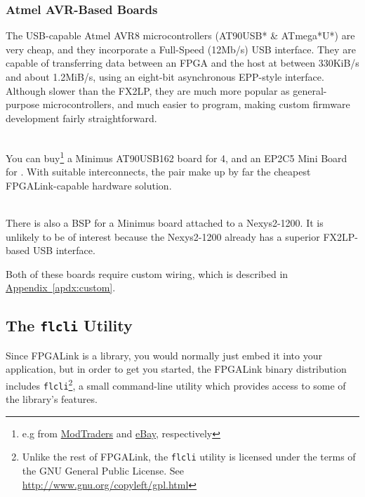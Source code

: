 \newpage
\subsubsection{Atmel AVR-Based Boards}

The USB-capable Atmel AVR8 microcontrollers (AT90USB* \& ATmega*U*) are very cheap, and they incorporate a Full-Speed (12Mb/s) USB interface. They are capable of transferring data between an FPGA and the host at between 330KiB/s and about 1.2MiB/s, using an eight-bit asynchronous EPP-style interface. Although slower than the FX2LP, they are much more popular as general-purpose microcontrollers, and much easier to program, making custom firmware development fairly straightforward.

\begin{desc}
  \item[\sffamily{Minimus/EP2C5 Board:}] \hfill \\
    You can buy\footnote{e.g from \href{http://www.modtraders.co.uk/minimus-avr-usb-development-board.html}{ModTraders} and \href{http://www.ebay.co.uk/itm/New-Altera-CycloneII-EP2C5T144-FPGA-Mini-Development-Board-/230767965142}{eBay}, respectively} a Minimus AT90USB162 board for \textsterling{}4, and an EP2C5 Mini Board for . With suitable interconnects, the pair make up by far the cheapest FPGALink-capable hardware solution.
  \item[\sffamily{Minimus/Nexys2 Board:}] \hfill \\
    There is also a BSP for a Minimus board attached to a Nexys2-1200. It is unlikely to be of interest because the Nexys2-1200 already has a superior FX2LP-based USB interface.
\end{desc}

Both of these boards require custom wiring, which is described in \hyperref[apdx:custom]{Appendix~\ref*{apdx:custom}}.

\subsection{The \texttt{flcli} Utility}
Since FPGALink is a library, you would normally just embed it into your application, but in order to get you started, the FPGALink binary distribution includes \texttt{flcli}\footnote{Unlike the rest of FPGALink, the \texttt{flcli} utility is licensed under the terms of the GNU General Public License. See \url{http://www.gnu.org/copyleft/gpl.html}}, a small command-line utility which provides access to some of the library's features.

